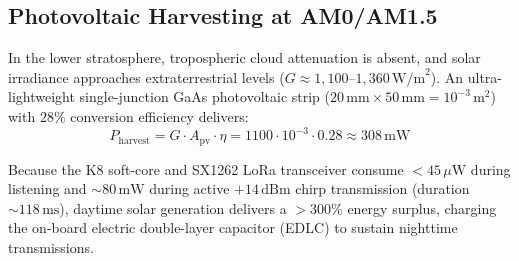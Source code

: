 \documentclass[10pt,twocolumn,letterpaper]{article}
\begin{document}
\begin{table}[ht]
\centering
\footnotesize
\caption{Mass Budget for the $1.46\text{-Gram}$ Stratospheric Node}
\label{tab:strat_mass}
\end{table}

\subsection{Photovoltaic Harvesting at AM0/AM1.5}

In the lower stratosphere, tropospheric cloud attenuation is absent, and solar irradiance approaches extraterrestrial levels ($G \approx 1{,}100\text{--}1{,}360\,\text{W/m}^2$). An ultra-lightweight single-junction GaAs photovoltaic strip ($20\,\text{mm} \times 50\,\text{mm} = 10^{-3}\,\text{m}^2$) with $28\%$ conversion efficiency delivers:
\begin{equation}
P_{\text{harvest}} = G \cdot A_{\text{pv}} \cdot \eta = 1100 \cdot 10^{-3} \cdot 0.28 \approx 308\,\text{mW}
\end{equation}

Because the K8 soft-core and SX1262 LoRa transceiver consume $<45\,\mu\text{W}$ during listening and $\sim 80\,\text{mW}$ during active $+14\,\text{dBm}$ chirp transmission (duration $\sim 118\,\text{ms}$), daytime solar generation delivers a $>300\%$ energy surplus, charging the on-board electric double-layer capacitor (EDLC) to sustain nighttime transmissions.
\end{document}
